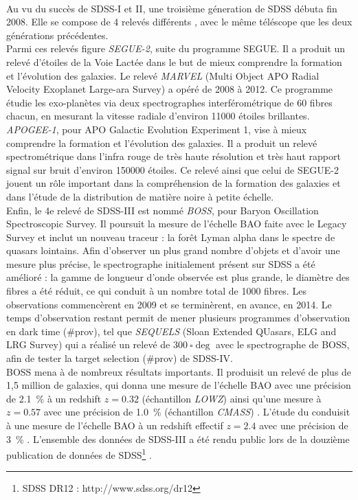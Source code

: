 \documentclass[11pt, twoside, a4paper, openright]{report}
\begin{document}
\paragraph{}
Au vu du succès de SDSS-I et II, une troisième géneration de SDSS débuta fin 2008. Elle se compose de 4 relevés différents \autocite{Eisenstein2011}, avec le même téléscope que les deux générations précédentes. \\
Parmi ces relevés figure \emph{SEGUE-2}, suite du programme SEGUE. Il a produit un relevé d'étoiles de la Voie Lactée dans le but de mieux comprendre la formation et l'évolution des galaxies. Le relevé \emph{MARVEL} (Multi Object APO Radial Velocity Exoplanet Large-ara Survey) a opéré de 2008 à 2012. Ce programme étudie les exo-planètes via deux spectrographes interférométrique de 60 fibres chacun, en mesurant la vitesse radiale d'environ \num{11000} étoiles brillantes. \emph{APOGEE-1}, pour APO Galactic Evolution Experiment 1, vise à mieux comprendre la formation et l'évolution des galaxies. Il a produit un relevé spectrométrique dans l'infra rouge de très haute résolution et très haut rapport signal sur bruit d'environ \num{150000} étoiles. Ce relevé ainsi que celui de SEGUE-2 jouent un rôle important dans la compréhension de la formation des galaxies et dans l'étude de la distribution de matière noire à petite échelle.\\
Enfin, le 4e relevé de SDSS-III est nommé \emph{BOSS}, pour Baryon Oscillation Spectroscopic Survey. Il poursuit la mesure de l'échelle BAO faite avec le Legacy Survey et inclut un nouveau traceur : la forêt Lyman alpha dans le spectre de quasars lointains. Afin d'observer un plus grand nombre d'objets et d'avoir une mesure plus précise, le spectrographe initialement présent sur SDSS a été amélioré : la gamme de longueur d'onde observée est plus grande, le diamètre des fibres a été réduit, ce qui conduit à un nombre total de \num{1000} fibres. Les observations commencèrent en 2009 et se terminèrent, en avance, en 2014. Le temps d'observation restant permit de mener plusieurs programmes d'observation en dark time (\#prov), tel que \emph{SEQUELS} (Sloan Extended QUasars, ELG and LRG Survey) qui a réalisé un relevé de $\SI{300}{\square\deg}$ avec le spectrographe de BOSS, afin de tester la target selection (\#prov) de SDSS-IV.\\
BOSS mena à de nombreux résultats importants. Il produisit un relevé de plus de 1,5 million de galaxies, qui donna une mesure de l'échelle BAO avec une précision de \SI{2,1}{\percent} à un redshift $z=\num{0,32}$ (échantillon \emph{LOWZ}) ainsi qu'une mesure à $z=\num{0,57}$ avec une précision de \SI{1,0}{\percent} (échantillon \emph{CMASS}) \autocite{Alam2016}. L'étude du \lya{} conduisit à une mesure de l'échelle BAO à un redshift effectif $z=\num{2,4}$ avec une précision de \SI{3}{\percent} \autocite{Bourboux2019}.
L'ensemble des données de SDSS-III a été rendu public lors de la douzième publication de données de SDSS\footnote{SDSS DR12 : http://www.sdss.org/dr12} \autocite{Alam2015}.
\end{document}
